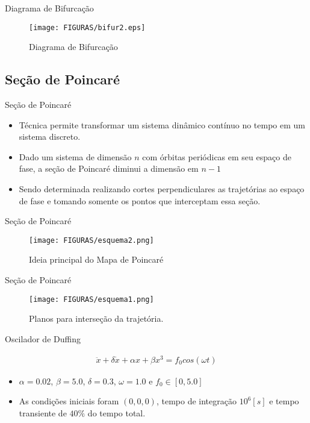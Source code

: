 \documentclass[12pt,aspectratio=169]{beamer}
\begin{document}
\begin{frame}{Diagrama de Bifurcação}
\begin{figure}[h]
\centering
\texttt{[image: FIGURAS/bifur2.eps]} 
\caption{Diagrama de Bifurcação}
\label{fig:02}
\end{figure}
\end{frame}

\subsection{Seção de Poincaré}
\begin{frame}{Seção de Poincaré}
\begin{itemize}
    \item Técnica permite transformar um sistema dinâmico contínuo no tempo em um sistema discreto.
    \item Dado um sistema de dimensão $n$ com órbitas periódicas em seu espaço de fase, a seção de Poincaré diminui a dimensão em $n-1$
    \item Sendo determinada realizando cortes perpendiculares as trajetórias ao espaço de fase e tomando somente os pontos que interceptam essa seção.
\end{itemize}
\end{frame}


\begin{frame}{Seção de Poincaré}
\begin{figure}[h]
\centering
\texttt{[image: FIGURAS/esquema2.png]} 
\caption{Ideia principal do Mapa de Poincaré}
\label{fig:03}
\end{figure}
\end{frame}


\begin{frame}{Seção de Poincaré}
\begin{figure}[h]
\centering
\texttt{[image: FIGURAS/esquema1.png]} 
\caption{Planos para interseção da trajetória.}
\label{fig:03}
\end{figure}
\end{frame}

\begin{frame}{Oscilador de Duffing }
    \begin{block}{}
        \begin{eqnarray}
            \ddot{x}+\delta\dot{x}+\alpha x+\beta x^3 = f_0cos(\omega t)
    \end{eqnarray}
    \begin{itemize}
        \item $\alpha =0.02$, $\beta=5.0$, $\delta=0.3$, $\omega=1.0$ e $f_0 \in [0,5.0]$
        \item As condições iniciais foram $(0,0,0)$, tempo de integração $10^6[s]$ e tempo transiente de $40\%$ do tempo total.
    \end{itemize}
    \end{block}
\end{frame}
\end{document}
